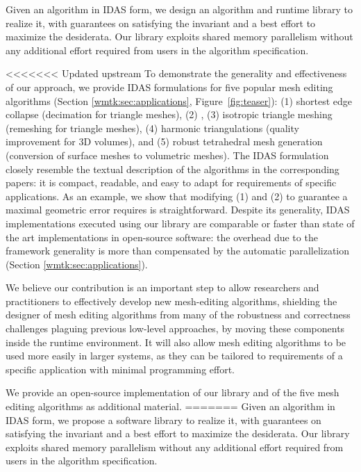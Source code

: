 Given an algorithm in IDAS form, we design an algorithm and runtime library to realize it, with guarantees on satisfying the invariant and a best effort to maximize the desiderata. Our library exploits shared memory parallelism without any additional effort required from users in the algorithm specification. 

<<<<<<< Updated upstream
To demonstrate the generality and effectiveness of our approach, we provide IDAS formulations for five popular mesh editing algorithms (Section \ref{wmtk:sec:applications}, Figure~\ref{fig:teaser}): (1) shortest edge collapse \cite{hoppe1996progressive} (decimation for triangle meshes), (2)  \cite{garland1997surface}, (3) isotropic triangle meshing \cite{botsch2004remeshing} (remeshing for triangle meshes), (4) harmonic triangulations \cite{Alexa:2019} (quality improvement for 3D volumes), and (5) robust tetrahedral mesh generation \cite{Hu:2019:fTetWild} (conversion of surface meshes to volumetric meshes). 
The IDAS formulation closely resemble the textual description of the algorithms in the corresponding papers: it is compact, readable, and easy to adapt for requirements of specific applications. As an example, we show that modifying (1) and (2) to guarantee a maximal geometric error requires is straightforward. Despite its generality, IDAS implementations executed using our library are comparable or faster than state of the art implementations in open-source software: the overhead due to the framework generality is more than compensated by the automatic parallelization (Section \ref{wmtk:sec:applications}).

We believe our contribution is an important step to allow researchers and practitioners to effectively develop new mesh-editing algorithms, shielding the designer of mesh editing algorithms from many of the robustness and correctness challenges plaguing previous low-level approaches, by moving these components inside the runtime environment. It will also allow mesh editing algorithms to be used more easily in larger systems, as they can be tailored to requirements of a specific application with minimal programming effort.

We provide an open-source implementation of our library and of the five mesh editing algorithms as additional material.
=======
Given an algorithm in IDAS form, we propose a software library to realize it, with guarantees on satisfying the invariant and a best effort to maximize the desiderata. Our library exploits shared memory parallelism without any additional effort required from users in the algorithm specification. 

